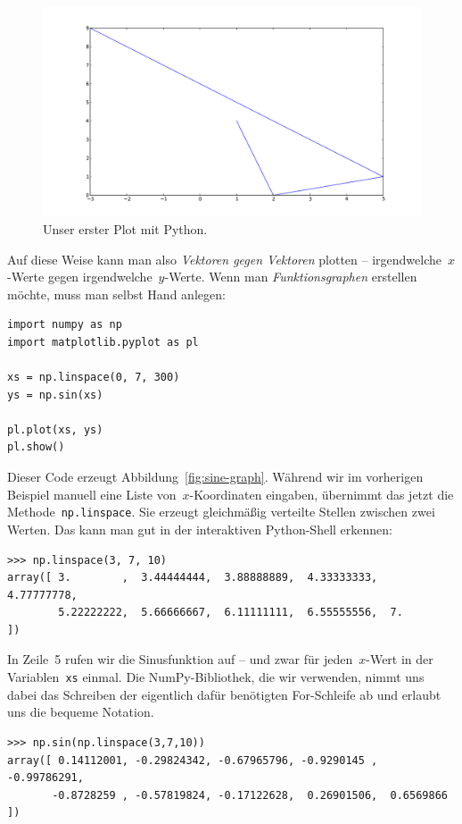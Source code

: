 \documentclass{blatt}
\begin{document}
\begin{figure}
  \centering
  \includegraphics[scale=0.4]{first-plot}
  \caption{\label{fig:first-plot}Unser erster Plot mit Python.}
\end{figure}

Auf diese Weise kann man also \emph{Vektoren gegen Vektoren} plotten --
irgendwelche~$x$-Werte gegen irgendwelche~$y$-Werte. Wenn man
\emph{Funktionsgraphen} erstellen möchte, muss man selbst Hand anlegen:

\begin{verbatim}
import numpy as np
import matplotlib.pyplot as pl

xs = np.linspace(0, 7, 300)
ys = np.sin(xs)

pl.plot(xs, ys)
pl.show()
\end{verbatim}

Dieser Code erzeugt Abbildung~\ref{fig:sine-graph}. Während wir im vorherigen
Beispiel manuell eine Liste von~$x$-Koordinaten eingaben, übernimmt das
jetzt die Methode~\texttt{np.linspace}. Sie erzeugt gleichmäßig
verteilte Stellen zwischen zwei Werten. Das kann man gut in der interaktiven
Python-Shell erkennen:
\begin{verbatim}
>>> np.linspace(3, 7, 10)
array([ 3.        ,  3.44444444,  3.88888889,  4.33333333,  4.77777778,
        5.22222222,  5.66666667,  6.11111111,  6.55555556,  7.        ])
\end{verbatim}
In Zeile~5 rufen wir die Sinusfunktion auf -- und zwar für jeden~$x$-Wert in
der Variablen~\texttt{xs} einmal. Die NumPy-Bibliothek, die wir
verwenden, nimmt uns dabei das Schreiben der eigentlich dafür benötigten
For-Schleife ab und erlaubt uns die bequeme Notation.
\begin{verbatim}
>>> np.sin(np.linspace(3,7,10))
array([ 0.14112001, -0.29824342, -0.67965796, -0.9290145 , -0.99786291,
       -0.8728259 , -0.57819824, -0.17122628,  0.26901506,  0.6569866 ])
\end{verbatim}
\end{document}
